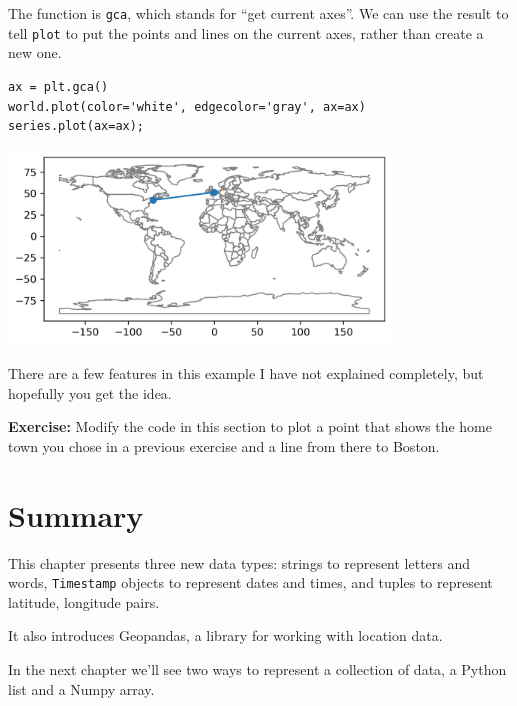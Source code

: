 The function is \passthrough{\lstinline!gca!}, which stands for ``get
current axes''. We can use the result to tell
\passthrough{\lstinline!plot!} to put the points and lines on the
current axes, rather than create a new one.

\begin{lstlisting}[]
ax = plt.gca()
world.plot(color='white', edgecolor='gray', ax=ax)
series.plot(ax=ax);
\end{lstlisting}

\begin{center}
\includegraphics[width=4in]{chapters/02_times_files/02_times_130_0.png}
\end{center}

There are a few features in this example I have not explained
completely, but hopefully you get the idea.

\textbf{Exercise:} Modify the code in this section to plot a point that
shows the home town you chose in a previous exercise and a line from
there to Boston.

\hypertarget{summary}{%
\section{Summary}\label{summary}}

This chapter presents three new data types: strings to represent letters
and words, \passthrough{\lstinline!Timestamp!} objects to represent
dates and times, and tuples to represent latitude, longitude pairs.

It also introduces Geopandas, a library for working with location data.

In the next chapter we'll see two ways to represent a collection of
data, a Python list and a Numpy array.

